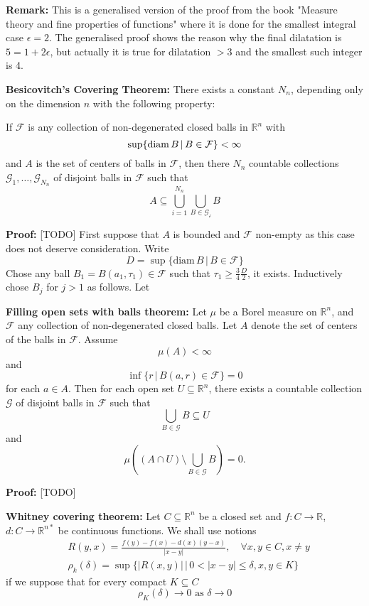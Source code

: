 \documentclass{article}
\begin{document}
\vspace{1ex}
\textbf{Remark:} This is a generalised version of the proof from the book
"Measure theory and fine properties of functions" where it is done for the
smallest integral case $\epsilon = 2$. The generalised proof shows the reason
why the final dilatation is $5 = 1+2\epsilon$, but actually it is true for
dilatation $>3$ and the smallest such integer is 4.


\vspace{2ex}
\textbf{Besicovitch’s Covering Theorem:} There exists a constant $N_n$, depending
only on the dimension $n$ with the following property:

\vspace{1ex}
If $\mathcal{F}$ is any collection of non-degenerated closed balls in
$\mathbb{R}^n$ with
\[\sup\{\textnormal{diam}\,B\,|\,B\in\mathcal F\}<\infty\]
and $A$ is the set of centers of balls in $\mathcal F$, then there $N_n$
countable collections $\mathcal{G}_1,\ldots,\mathcal{G}_{N_n}$ of disjoint
balls in $\mathcal{F}$ such that
\[A\subseteq\bigcup_{i=1}^{N_n}\bigcup_{B\in\mathcal{G_i}}B\]

\vspace{1ex}
\textbf{Proof:} [TODO]
First suppose that $A$ is bounded and $\mathcal F$ non-empty as this case does
not deserve consideration. Write
\[D=\sup\{\text{diam}\,B\,|\,B\in\mathcal F\}\]
Chose any ball $B_1=B(a_1, \tau_1)\in\mathcal F$ such that $\tau_1\geq\frac{3}{4}
\frac{D}{2}$, it exists. Inductively chose $B_j$ for $j>1$ as follows. Let

\vspace{2ex}
\textbf{Filling open sets with balls theorem:} Let $\mu$ be a Borel measure on
$\mathbb{R}^n$, and $\mathcal{F}$ any collection of non-degenerated closed balls.
Let $A$ denote the set of centers of the balls in $\mathcal F$. Assume
\[\mu(A)<\infty\]
and
\[\inf\{r\,|\,B(a,r)\in\mathcal F\}=0\]
for each $a\in A$. Then for each open set $U\subseteq\mathbb{R}^n$, there
exists a countable collection $\mathcal G$ of disjoint balls in $\mathcal F$ such that
\[\bigcup_{B\in\mathcal G} B\subseteq U\]
and
\[\mu\left((A\cap U)\setminus\bigcup_{B\in\mathcal G}B\right)=0.\]

\vspace{1ex}
\textbf{Proof:} [TODO]

\vspace{2ex}
\textbf{Whitney covering theorem:}
Let $C\subseteq \mathbb{R}^n$ be a closed set and $f:C\rightarrow\mathbb R$,
$d:C\rightarrow\mathbb{R}^{n*}$ be continuous functions. We shall use notions
\[
\begin{aligned}
    &R(y,x)=\frac{f(y)-f(x)-d(x)(y-x)}{|x-y|},\quad\forall x,y\in C, x\neq y \\
    &\rho_k(\delta)=\sup\{|R(x,y)|\, |\, 0<|x-y|\leq\delta, x, y\in K\}
\end{aligned}
\]
if we suppose that for every compact $K\subseteq C$
\begin{equation}
\rho_K(\delta)\rightarrow 0\text{ as }\delta\rightarrow 0
\end{equation}
\end{document}
